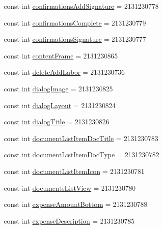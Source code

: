 \begin{DoxyCompactItemize}
\item 
const int \hyperlink{class_field_service_1_1_android_1_1_resource_1_1_id_ad0dbdc6d66b600ae6797e27aeabc1564}{confirmations\+Add\+Signature} = 2131230778
\item 
const int \hyperlink{class_field_service_1_1_android_1_1_resource_1_1_id_aa4694332738c70e71c018ce42f19bc32}{confirmations\+Complete} = 2131230779
\item 
const int \hyperlink{class_field_service_1_1_android_1_1_resource_1_1_id_a12d38d35ccbba3fed2b26d7b4bcdad21}{confirmations\+Signature} = 2131230777
\item 
const int \hyperlink{class_field_service_1_1_android_1_1_resource_1_1_id_a06b7d70e58e68d820b593ba59600a377}{content\+Frame} = 2131230865
\item 
const int \hyperlink{class_field_service_1_1_android_1_1_resource_1_1_id_a2f9aaf830d3bde65e3cc423cd68bdcf1}{delete\+Add\+Labor} = 2131230736
\item 
const int \hyperlink{class_field_service_1_1_android_1_1_resource_1_1_id_a09514e2da611d7a463a278f16d37ceab}{dialog\+Image} = 2131230825
\item 
const int \hyperlink{class_field_service_1_1_android_1_1_resource_1_1_id_acfe3990d4c9712e565e37688fd6d3da0}{dialog\+Layout} = 2131230824
\item 
const int \hyperlink{class_field_service_1_1_android_1_1_resource_1_1_id_a25e91fe37698c0136ce68a187f8136a6}{dialog\+Title} = 2131230826
\item 
const int \hyperlink{class_field_service_1_1_android_1_1_resource_1_1_id_a29214d62222eadcf1fd58117d1dd3159}{document\+List\+Item\+Doc\+Title} = 2131230783
\item 
const int \hyperlink{class_field_service_1_1_android_1_1_resource_1_1_id_a5c07cb87edbdacd3f7cccb69fb550f0c}{document\+List\+Item\+Doc\+Type} = 2131230782
\item 
const int \hyperlink{class_field_service_1_1_android_1_1_resource_1_1_id_a22a03f86e3421322feb9e85e16f73c07}{document\+List\+Item\+Icon} = 2131230781
\item 
const int \hyperlink{class_field_service_1_1_android_1_1_resource_1_1_id_a7a6844737c25843624ff0f909b753408}{documents\+List\+View} = 2131230780
\item 
const int \hyperlink{class_field_service_1_1_android_1_1_resource_1_1_id_a7ab778ebd493a0310e480ee5d99d315f}{expense\+Amount\+Bottom} = 2131230788
\item 
const int \hyperlink{class_field_service_1_1_android_1_1_resource_1_1_id_a6227cfb47d5c9174f9e0886fc802554b}{expense\+Description} = 2131230785

\end{DoxyCompactItemize}
